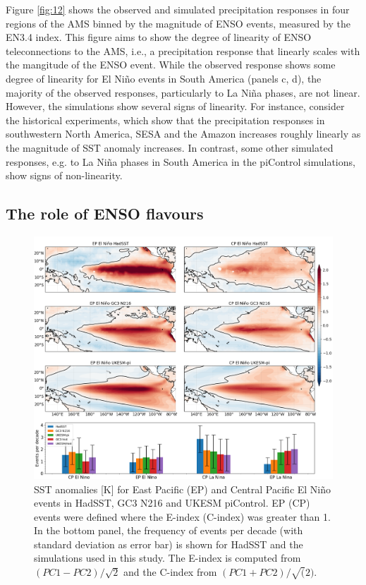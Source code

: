  Figure \ref{fig:12} shows the observed and simulated precipitation responses in four regions of the AMS binned by the magnitude of ENSO events, measured by the EN3.4 index. This figure aims to show  the degree of linearity of ENSO teleconnections to the AMS, i.e., a precipitation response that linearly scales with the mangitude of the ENSO event.
While the observed response shows some degree of linearity for El Ni\~no events in South America (panels c, d), the majority of the observed responses, particularly to La Ni\~na phases, are not linear. However, the simulations show several signs of linearity. For instance, consider the historical experiments, which show that the precipitation responses in southwestern North America, SESA and the Amazon increases roughly linearly as the magnitude of SST anomaly increases. In contrast, some other simulated responses, e.g. to La Ni\~na phases in South America in the piControl simulations, show signs of non-linearity.



\subsection{The role of ENSO flavours}
  
\begin{figure}[b!]
\includegraphics[width=\linewidth]{figures/epcpmap}
\caption[Diversity of ENSO SST patterns]{SST anomalies [K] for East Pacific (EP) and Central Pacific El Niño events in HadSST, GC3 N216 and UKESM piControl. EP (CP) events were defined where the E-index (C-index) was greater than 1. In the bottom panel, the frequency of events per decade (with standard deviation as error bar) is shown for HadSST and the simulations used in this study.
The E-index is computed from $(PC1-PC2)/\sqrt{2}$ and the C-index from $(PC1+PC2)/\sqrt(2)$.
}
\label{fig:s1}
\end{figure}


